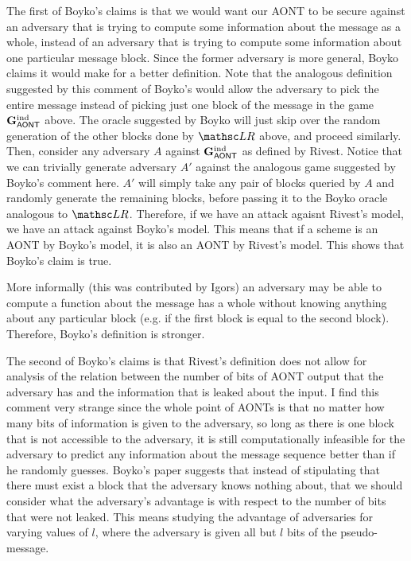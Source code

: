 \documentclass[11pt,twoside]{article}
\begin{document}
The first of Boyko's claims is that we would want our AONT to be secure against an adversary that is trying to compute some information about the message as a whole, instead of an adversary that is trying to compute some information about one particular message block. Since the former adversary is more general, Boyko claims it would make for a better definition. Note that the analogous definition suggested by this comment of Boyko's would allow the adversary to pick the entire message instead of picking just one block of the message in the game $\mathbf{G}_{\mathsf{AONT}}^\text{ind}$ above. The oracle suggested by Boyko will just skip over the random generation of the other blocks done by $\LRO$ above, and proceed similarly. Then, consider any adversary $A$ against $\mathbf{G}_{\mathsf{AONT}}^\text{ind}$ as defined by Rivest. Notice that we can trivially generate adversary $A'$ against the analogous game suggested by Boyko's comment here. $A'$ will simply take any pair of blocks queried by $A$ and randomly generate the remaining blocks, before passing it to the Boyko oracle analogous to $\LRO$. Therefore, if we have an attack agaisnt Rivest's model, we have an attack against Boyko's model. This means that if a scheme is an AONT by Boyko's model, it is also an AONT by Rivest's model. This shows that Boyko's claim is true. 

More informally (this was contributed by Igors) an adversary may be able to compute a function about the message has a whole without knowing anything about any particular block (e.g. if the first block is equal to the second block). Therefore, Boyko's definition is stronger. 

The second of Boyko's claims is that Rivest's definition does not allow for analysis of the relation between the number of bits of AONT output that the adversary has and the information that is leaked about the input. I find this comment very strange since the whole point of AONTs is that no matter how many bits of information is given to the adversary, so long as there is one block that is not accessible to the adversary, it is still computationally infeasible for the adversary to predict any information about the message sequence better than if he randomly guesses. Boyko's paper suggests that instead of stipulating that there must exist a block that the adversary knows nothing about, that we should consider what the adversary's advantage is with respect to the number of bits that were not leaked. This means studying the advantage of adversaries for varying values of $l$, where the adversary is given all but $l$ bits of the pseudo-message. 
\end{document}
